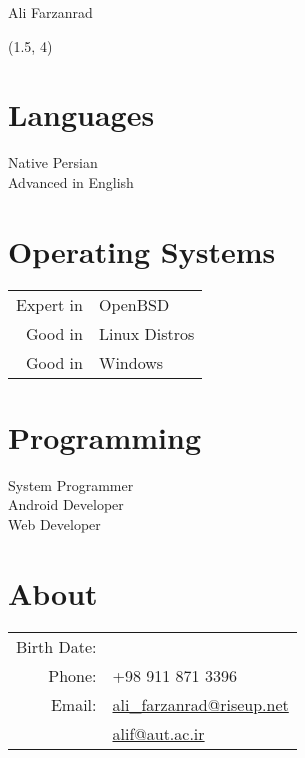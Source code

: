 \documentclass[a4paper,10pt]{article}
\newcommand{\birthdate}{\DTMdate{1990-05-10}}
\begin{document}
{\Huge Ali Farzanrad}

\begin{textblock}{3.8}(1.5, 4)
	\raggedleft
	\section*{Languages}

	Native Persian \\
	Advanced in English

	\section*{Operating Systems}

	\begin{tabular}{rl}
		Expert in & OpenBSD \\
		Good in & Linux Distros \\
		Good in & Windows
	\end{tabular}

	\section*{Programming}

	System Programmer \\
	Android Developer \\
	Web Developer

\end{textblock}

\section*{{\color{blue}About}}

\begin{tabular}{rl}
Birth Date: & {\birthdate} \\
Phone:	& +98 911 871 3396 \\
Email:	& \href{mailto:ali_farzanrad@riseup.net}{ali\_farzanrad@riseup.net} \\
	& \href{mailto:alif@aut.ac.ir}{alif@aut.ac.ir}
\end{tabular}
\end{document}
